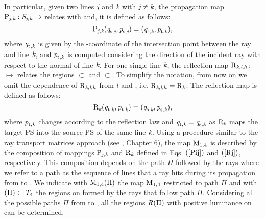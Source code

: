 In particular, given two lines $\textit{j}$ and $\textit{k}$ with $\textit{j}\neq\textit{k}$, the propagation map $\mathrm{P}_{\textit{j},\textit{k}}: \mbox{$\emph{S}_{\textit{\textit{j},\textit{k}}}$}\mapsto$ relates  with  and, it is defined as follows:
 \begin{equation}\label{Pij}
\mathrm{P}_{\textit{j},\textit{k}}(\textit{q}_{\textrm{s,} \textit{\textit{j}}},\textit{p}_{\textrm{s,} \textit{\textit{j}}})=(\textit{q}_{\textrm{t,} \textit{\textit{k}}},\textit{p}_{\textrm{t,} \textit{\textit{k}}}),
\end{equation}
where $\textit{q}_{\textrm{t,} \textit{\textit{k}}}$ is given by the -coordinate of the intersection point between the ray and line $\textit{k}$,
and $\textit{p}_{\textrm{t,} \textit{\textit{k}}}$ is computed considering the direction of the incident ray with respect to the normal of line $\textit{k}$. 
For one single line $\textit{k}$, the reflection map $\mathrm{R}_{\textit{k},\textit{l},h}$:~ $\mapsto$  relates the regions $\subset$ and
$\subset$. To simplify the notation, from now on we omit the dependence of $\mathrm{R}_{\textit{k},\textit{l},h}$ from $\textit{l}$ and , i.e. $\mathrm{R}_{\textit{k},\textit{l},h} = \mathrm{R}_{\textit{k}}$. The reflection map is defined as follows:
\begin{equation}\label{Rj}
\mathrm{R}_{\textit{k}}(\textit{q}_{\textrm{t},\textit{\textit{k}}},\textit{p}_{\textrm{t},\textit{\textit{k}}})=(\textit{q}_{\textrm{s},\textit{\textit{k}}},\textit{p}_{\textrm{s},\textit{\textit{k}}}),
\end{equation}
where $\textit{p}_{\textrm{t,} \textit{\textit{k}}}$ changes according to the reflection law and $\textit{q}_{\textrm{t,} \textit{\textit{k}}}= \textit{q}_{\textrm{s,} \textit{\textit{k}}}$ as $\mathrm{R}_{\textit{k}}$ maps the target PS into the source PS of the same line $\textit{k}$.
Using a procedure similar to the ray transport matrices approach (see \cite{hecht1998hecht}, Chapter 6),
the map $\mathrm{M}_{1,4}$ is described by the composition of mappings $\mathrm{P}_{\textit{j},\textit{k}}$ and $\mathrm{R}_{\textit{k}}$ defined in Eqs.
$(\ref{Pij})$ and $(\ref{Rj})$, respectively. This composition depends on the path $\Pi$ followed by the rays where we refer to a path as the sequence of lines that
 a ray hits during its propagation from  to . We indicate with $\mathrm{M}_{1,4}(\Pi)$
the map $\mathrm{M}_{1,4}$ restricted to path $\Pi$ and with $(\Pi)\subset \mbox{$\emph{T}_{\textit{$4$}}$}$ the regions on  formed by the rays that follow path $\Pi$.
Considering all the possible paths $\Pi$ from  to , all the regions $\mbox{$\emph{R}_{\textit{}}$}(\Pi)$ with positive luminance on  can be determined.
